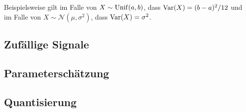 Beispielsweise gilt im Falle von $X \sim \operatorname*{Unif}(a,b)$, dass $\operatorname*{Var}(X) = (b-a)^2/12$ und im Falle von $X \sim \mathcal{N}(\mu, \sigma^2)$, dass $\operatorname*{Var}(X) = \sigma^2$.

\subsection{Zufällige Signale}


\subsection{Parameterschätzung}\label{sec:random:paramest}

\subsection{Quantisierung}\label{sec:random:quanti}

